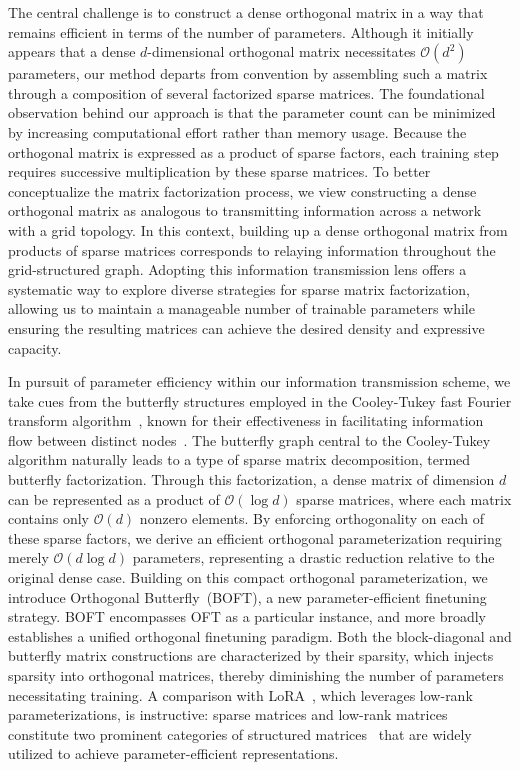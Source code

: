 The central challenge is to construct a dense orthogonal matrix in a way that remains efficient in terms of the number of parameters. Although it initially appears that a dense $d$-dimensional orthogonal matrix necessitates $\mathcal{O}(d^2)$ parameters, our method departs from convention by assembling such a matrix through a composition of several factorized sparse matrices. The foundational observation behind our approach is that the parameter count can be minimized by increasing computational effort rather than memory usage. Because the orthogonal matrix is expressed as a product of sparse factors, each training step requires successive multiplication by these sparse matrices. To better conceptualize the matrix factorization process, we view constructing a dense orthogonal matrix as analogous to transmitting information across a network with a grid topology. In this context, building up a dense orthogonal matrix from products of sparse matrices corresponds to relaying information throughout the grid-structured graph. Adopting this information transmission lens offers a systematic way to explore diverse strategies for sparse matrix factorization, allowing us to maintain a manageable number of trainable parameters while ensuring the resulting matrices can achieve the desired density and expressive capacity.

In pursuit of parameter efficiency within our information transmission scheme, we take cues from the butterfly structures employed in the Cooley-Tukey fast Fourier transform algorithm~\cite{cooley1965algorithm}, known for their effectiveness in facilitating information flow between distinct nodes~\cite{klasing1994broadcasting}. The butterfly graph central to the Cooley-Tukey algorithm naturally leads to a type of sparse matrix decomposition, termed butterfly factorization. Through this factorization, a dense matrix of dimension $d$ can be represented as a product of $\mathcal{O}(\log d)$ sparse matrices, where each matrix contains only $\mathcal{O}(d)$ nonzero elements. By enforcing orthogonality on each of these sparse factors, we derive an efficient orthogonal parameterization requiring merely $\mathcal{O}(d\log d)$ parameters, representing a drastic reduction relative to the original dense case. Building on this compact orthogonal parameterization, we introduce Orthogonal Butterfly~(BOFT), a new parameter-efficient finetuning strategy. BOFT encompasses OFT as a particular instance, and more broadly establishes a unified orthogonal finetuning paradigm. Both the block-diagonal and butterfly matrix constructions are characterized by their sparsity, which injects sparsity into orthogonal matrices, thereby diminishing the number of parameters necessitating training. A comparison with LoRA~\cite{hulora2022}, which leverages low-rank parameterizations, is instructive: sparse matrices and low-rank matrices constitute two prominent categories of structured matrices~\cite{candes2011robust} that are widely utilized to achieve parameter-efficient representations.

